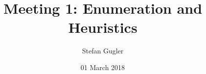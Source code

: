 \documentclass{beamer}
\title[Meeting 1]{Meeting 1: Enumeration and Heuristics} %
\author{Stefan Gugler} %
\institute[MIT] %
{
	Massachusetts Institute of Technology \\ %
	\medskip
	\textit{sgugler@mit.edu} %
}
\date{01 March 2018} %
\begin{document}
	
	\begin{frame}
	\titlepage %
\end{frame}




\end{document}

